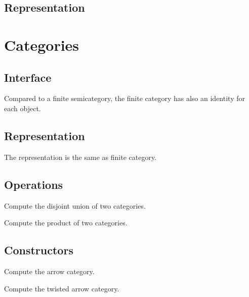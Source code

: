 \subsection*{Representation}


\section{Categories}
\subsection*{Interface}
Compared to a finite semicategory, the finite category
has also an identity for each object.

\subsection*{Representation}

The representation is the same as finite category.

\subsection*{Operations}

\begin{exercise}
Compute the disjoint union of two categories.

\end{exercise}

\begin{exercise}
Compute the product of two categories.

\end{exercise}


\subsection*{Constructors}


\begin{exercise}
Compute the arrow category.

\end{exercise}


\begin{exercise}
Compute the twisted arrow category.

\end{exercise}


